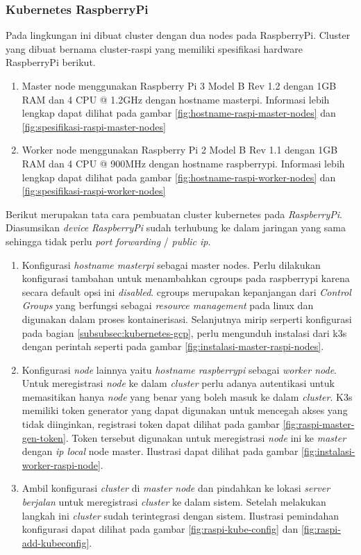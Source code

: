 \subsubsection{Kubernetes RaspberryPi}
Pada lingkungan ini dibuat cluster dengan dua nodes pada RaspberryPi. Cluster yang dibuat bernama cluster-raspi yang memiliki spesifikasi hardware RaspberryPi berikut.

\begin{enumerate}
  \item Master node menggunakan Raspberry Pi 3 Model B Rev 1.2 dengan 1GB RAM dan 4 CPU @ 1.2GHz dengan hostname masterpi. Informasi lebih lengkap dapat dilihat pada gambar \ref{fig:hostname-raspi-master-nodes} dan \ref{fig:spesifikasi-raspi-master-nodes}
  \item Worker node menggunakan Raspberry Pi 2 Model B Rev 1.1 dengan 1GB RAM dan 4 CPU @ 900MHz dengan hostname raspberrypi. Informasi lebih lengkap dapat dilihat pada gambar \ref{fig:hostname-raspi-worker-nodes} dan \ref{fig:spesifikasi-raspi-worker-nodes}
\end{enumerate}

Berikut merupakan tata cara pembuatan cluster kubernetes pada \textit{RaspberryPi}. Diasumsikan \textit{device} \textit{RaspberryPi} sudah terhubung ke dalam jaringan yang sama sehingga tidak perlu \textit{port forwarding} / \textit{public ip}.

\begin{enumerate}
  \item Konfigurasi \textit{hostname masterpi} sebagai master nodes. Perlu dilakukan konfigurasi tambahan untuk menambahkan cgroups pada raspberrypi karena secara default opsi ini \textit{disabled}. cgroups merupakan kepanjangan dari \textit{Control Groups} yang berfungsi sebagai \textit{resource management} pada linux dan digunakan dalam proses kontainerisasi. Selanjutnya mirip serperti konfigurasi pada bagian \ref{subsubsec:kubernetes-gcp}, perlu mengunduh instalasi dari k3s dengan perintah seperti pada gambar \ref{fig:instalasi-master-raspi-nodes}.
  \item Konfigurasi \textit{node} lainnya yaitu \textit{hostname raspberrypi} sebagai \textit{worker node}. Untuk meregistrasi \textit{node} ke dalam \textit{cluster} perlu adanya autentikasi untuk memasitikan hanya \textit{node} yang benar yang boleh masuk ke dalam \textit{cluster}. K3s memiliki token generator yang dapat digunakan untuk mencegah akses yang tidak diinginkan, registrasi token dapat dilihat pada gambar \ref{fig:raspi-master-gen-token}. Token tersebut digunakan untuk meregistrasi \textit{node} ini ke \textit{master} dengan \textit{ip local} node master. Ilustrasi dapat dilihat pada gambar \ref{fig:instalasi-worker-raspi-node}.
  \item Ambil konfigurasi \textit{cluster} di \textit{master node} dan pindahkan ke lokasi \textit{server berjalan} untuk meregistrasi \textit{cluster} ke dalam sistem. Setelah melakukan langkah ini \textit{cluster} sudah terintegrasi dengan sistem. Ilustrasi pemindahan konfigurasi dapat dilihat pada gambar \ref{fig:raspi-kube-config} dan \ref{fig:raspi-add-kubeconfig}.
\end{enumerate}